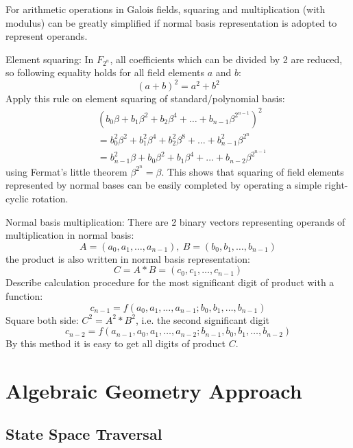 For arithmetic operations in Galois fields, squaring and multiplication (with modulus) can be greatly simplified if 
normal basis representation is adopted to represent operands.
\begin{Example}
\label{ex:nb_sq}
Element squaring: In $F_{2^n}$, all coefficients which can be divided by 2 are reduced, so 
following equality holds for all field elements $a$ and $b$:
$$(a+b)^2 = a^2 + b^2$$ 
Apply this rule on element squaring of standard/polynomial basis:
\begin{align}
& (b_0\beta + b_1\beta^2 + b_2\beta^4 + \dots + b_{n-1}\beta^{2^{n-1}})^2 \nonumber\\
&= b_0^2\beta^2 + b_1^2\beta^4 + b_2^2\beta^8 + \dots + b_{n-1}^2\beta^{2^n} \nonumber\\
&= b_{n-1}^2\beta + b_0\beta^2 + b_1\beta^4 + \dots + b_{n-2}\beta^{2^{n-1}} \nonumber
\end{align}
using Fermat's little theorem $\beta^{2^n} = \beta$. This shows that squaring of field elements
represented by normal bases can be easily completed by operating a simple right-cyclic rotation.
\end{Example}

\begin{Example}
\label{ex:nb_multi}
Normal basis multiplication: There are 2 binary vectors representing operands of multiplication in normal
basis: $$A = (a_0, a_1, \dots, a_{n-1}),\ B = (b_0, b_1, \dots, b_{n-1})$$ 
the product is also written in normal basis representation: $$C = A*B = (c_0, c_1, \dots, c_{n-1})$$
Describe calculation procedure for the most significant digit of product with a function: 
$$c_{n-1} = f(a_0, a_1, \dots, a_{n-1}; b_0, b_1, \dots, b_{n-1})$$
Square both side: $C^2 = A^2*B^2$, i.e. the second significant digit 
$$c_{n-2} = f(a_{n-1}, a_0, a_1, \dots, a_{n-2}; b_{n-1}, b_0, b_1, \dots, b_{n-2})$$ 
By this method it is easy to get all digits of product $C$.
\end{Example}
  
\section{Algebraic Geometry Approach}
\subsection{State Space Traversal}

